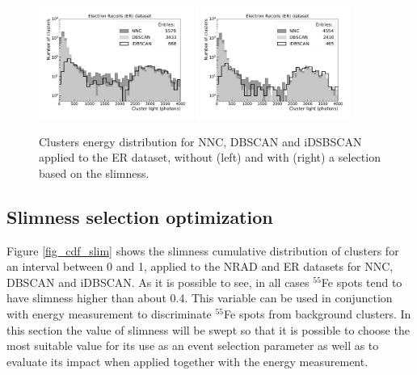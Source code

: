 \documentclass[a4paper,11pt]{article}
\begin{document}
\begin{figure}[ht]
\centering
\includegraphics[width=0.45\textwidth]{LigthYield_Fe_wo.pdf}
\includegraphics[width=0.45\textwidth]{LigthYield_Fe_Slim.pdf}
\caption{Clusters energy distribution for NNC, DBSCAN and iDSBSCAN applied to the ER dataset, without (left) and with (right) a selection based on the slimness.}
\label{fig_compfe}
\end{figure}




\subsection{Slimness selection optimization}
Figure \ref{fig_cdf_slim} shows the slimness cumulative distribution of clusters for an interval between 0 and 1, applied to the NRAD and ER datasets for NNC, DBSCAN and iDBSCAN.
As it is possible to see, in all cases $^{55}$Fe spots tend to have slimness higher than about 0.4.
This variable can be used in conjunction with energy measurement to discriminate $^{55}$Fe spots from background clusters.
In this section the value of slimness will be swept so that it is possible to choose the most suitable value for its use as an event selection parameter as well as to evaluate its impact when applied together with the energy measurement.
\end{document}
